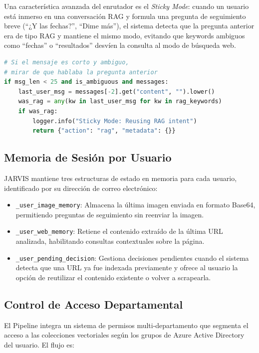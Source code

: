 Una característica avanzada del enrutador es el \textit{Sticky Mode}: cuando un usuario está inmerso en una conversación RAG y formula una pregunta de seguimiento breve (``¿Y las fechas?'', ``Dime más''), el sistema detecta que la pregunta anterior era de tipo RAG y mantiene el mismo modo, evitando que keywords ambiguos como ``fechas'' o ``resultados'' desvíen la consulta al modo de búsqueda web.

\begin{lstlisting}[language=Python, caption={Implementación del Sticky Mode.}]
# Si el mensaje es corto y ambiguo, 
# mirar de que hablaba la pregunta anterior
if msg_len < 25 and is_ambiguous and messages:
    last_user_msg = messages[-2].get("content", "").lower()
    was_rag = any(kw in last_user_msg for kw in rag_keywords)
    if was_rag:
        logger.info("Sticky Mode: Reusing RAG intent")
        return {"action": "rag", "metadata": {}}
\end{lstlisting}

\subsection{Memoria de Sesión por Usuario}

JARVIS mantiene tres estructuras de estado en memoria para cada usuario, identificado por su dirección de correo electrónico:

\begin{itemize}
    \item \texttt{\_user\_image\_memory}: Almacena la última imagen enviada en formato Base64, permitiendo preguntas de seguimiento sin reenviar la imagen.
    \item \texttt{\_user\_web\_memory}: Retiene el contenido extraído de la última URL analizada, habilitando consultas contextuales sobre la página.
    \item \texttt{\_user\_pending\_decision}: Gestiona decisiones pendientes cuando el sistema detecta que una URL ya fue indexada previamente y ofrece al usuario la opción de reutilizar el contenido existente o volver a scrapearla.
\end{itemize}

\subsection{Control de Acceso Departamental}

El Pipeline integra un sistema de permisos multi-departamento que segmenta el acceso a las colecciones vectoriales según los grupos de Azure Active Directory del usuario. El flujo es:

